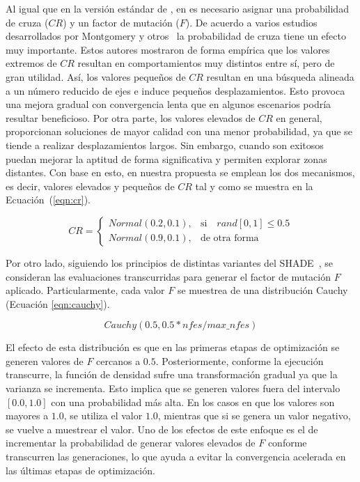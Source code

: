 Al igual que en la versión estándar de \DE{}, en \DEEDM{} es necesario asignar una probabilidad de cruza ($CR$) y un factor de mutación ($F$).
%
De acuerdo a varios estudios desarrollados por Montgomery y otros~\cite{montgomery2010analysis} la probabilidad de cruza tiene un efecto
muy importante.
%
Estos autores mostraron de forma empírica que los valores extremos de $CR$ resultan en comportamientos 
muy distintos entre sí, pero de gran utilidad.
%
Así, los valores pequeños de $CR$ resultan en una búsqueda alineada a un número reducido de ejes e induce pequeños desplazamientos.
%
Esto provoca una mejora gradual con convergencia lenta que en algunos escenarios podría resultar beneficioso.
%
Por otra parte, los valores elevados de $CR$ en general, proporcionan soluciones de mayor calidad con una menor probabilidad, 
ya que se tiende a realizar desplazamientos largos.
%
Sin embargo, cuando son exitosos puedan mejorar la aptitud de forma significativa y permiten explorar zonas distantes.
%
Con base en esto, en nuestra propuesta se emplean los dos mecanismos, es decir, valores elevados y pequeños de $CR$ tal y como se muestra
en la Ecuación~(\ref{eqn:cr}).

\begin{equation} \label{eqn:cr}
CR = 
\begin{cases}
     Normal(0.2, 0.1),& \text{si} \quad rand[0,1] \leq 0.5  \\
     Normal(0.9, 0.1),              & \text{de otra forma}
\end{cases}
\end{equation}

Por otro lado, siguiendo los principios de distintas variantes del SHADE~\cite{awad2016ensemble, brest2016shade}, se consideran las evaluaciones transcurridas
para generar el factor de mutación $F$ aplicado.
%
Particularmente, cada valor $F$ se muestrea de una distribución Cauchy (Ecuación \ref{eqn:cauchy}).

\begin{equation}\label{eqn:cauchy}
 Cauchy(0.5, 0.5*nfes/max\_nfes)
\end{equation}

El efecto de esta distribución es que en las primeras etapas de optimización se generen valores de $F$ cercanos a $0.5$.
%
Posteriormente, conforme la ejecución transcurre, la función de densidad sufre una transformación gradual ya que la varianza se incrementa.
%
Esto implica que se generen valores fuera del intervalo $[0.0, 1.0]$ con una probabilidad más alta.
%
En los casos en que los valores son mayores a $1.0$, se utiliza el valor $1.0$, mientras
que si se genera un valor negativo, se vuelve a muestrear el valor.
%
Uno de los efectos de este enfoque es el de incrementar la probabilidad de generar valores elevados de $F$ conforme transcurren las generaciones, lo que ayuda a evitar
la convergencia acelerada en las últimas etapas de optimización.


